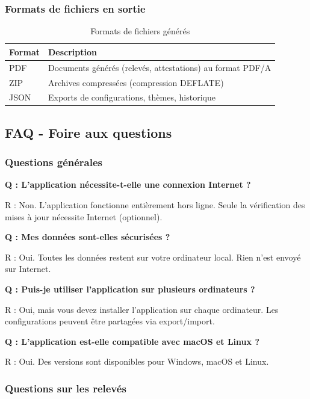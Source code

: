 \subsubsection{Formats de fichiers en sortie}

\begin{table}[h]
\centering
\begin{tabular}{|l|p{10cm}|}
\hline
\textbf{Format} & \textbf{Description} \\
\hline
PDF & Documents générés (relevés, attestations) au format PDF/A \\
\hline
ZIP & Archives compressées (compression DEFLATE) \\
\hline
JSON & Exports de configurations, thèmes, historique \\
\hline
\end{tabular}
\caption{Formats de fichiers générés}
\end{table}

\subsection{FAQ - Foire aux questions}

\subsubsection{Questions générales}

\textbf{Q : L'application nécessite-t-elle une connexion Internet ?}

R : Non. L'application fonctionne entièrement hors ligne. Seule la vérification des mises à jour nécessite Internet (optionnel).

\textbf{Q : Mes données sont-elles sécurisées ?}

R : Oui. Toutes les données restent sur votre ordinateur local. Rien n'est envoyé sur Internet.

\textbf{Q : Puis-je utiliser l'application sur plusieurs ordinateurs ?}

R : Oui, mais vous devez installer l'application sur chaque ordinateur. Les configurations peuvent être partagées via export/import.

\textbf{Q : L'application est-elle compatible avec macOS et Linux ?}

R : Oui. Des versions sont disponibles pour Windows, macOS et Linux.

\subsubsection{Questions sur les relevés}

